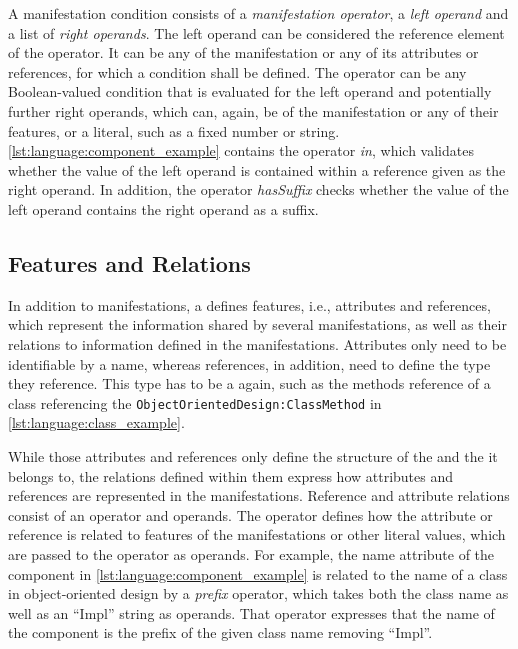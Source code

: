 A manifestation condition consists of a \emph{manifestation operator}, a \emph{left operand} and a list of \emph{right operands}.
The left operand can be considered the reference element of the operator. 
It can be any \metaclass of the manifestation or any of its attributes or references, for which a condition shall be defined.
The operator can be any Boolean-valued condition that is evaluated for the left operand and potentially further right operands, which can, again, be \metaclasses of the manifestation or any of their features, or a literal, such as a fixed number or string.
\autoref{lst:language:component_example} contains the operator \emph{in}, which validates whether the value of the left operand is contained within a reference given as the right operand.
In addition, the operator \emph{hasSuffix} checks whether the value of the left operand contains the right operand as a suffix.


\subsection{Features and Relations}
\label{chap:language:commonalities:features}

In addition to manifestations, a \commonality defines features, i.e., attributes and references, which represent the information shared by several manifestations, as well as their relations to information defined in the manifestations.
Attributes only need to be identifiable by a name, whereas references, in addition, need to define the type they reference.
This type has to be a \commonality again, such as the methods reference of a class referencing the \commonality \texttt{ObjectOrientedDesign:ClassMethod} in \autoref{lst:language:class_example}.

While those attributes and references only define the structure of the \commonality and the \conceptmetamodel it belongs to, the relations defined within them express how attributes and references are represented in the manifestations.
Reference and attribute relations consist of an operator and operands.
The operator defines how the \commonality attribute or reference is related to features of the manifestations or other literal values, which are passed to the operator as operands.
For example, the name attribute of the component \commonality in \autoref{lst:language:component_example} is related to the name of a class in object-oriented design by a \emph{prefix} operator, which takes both the class name as well as an \enquote{Impl} string as operands.
That operator expresses that the name of the component \commonality is the prefix of the given class name removing \enquote{Impl}.

